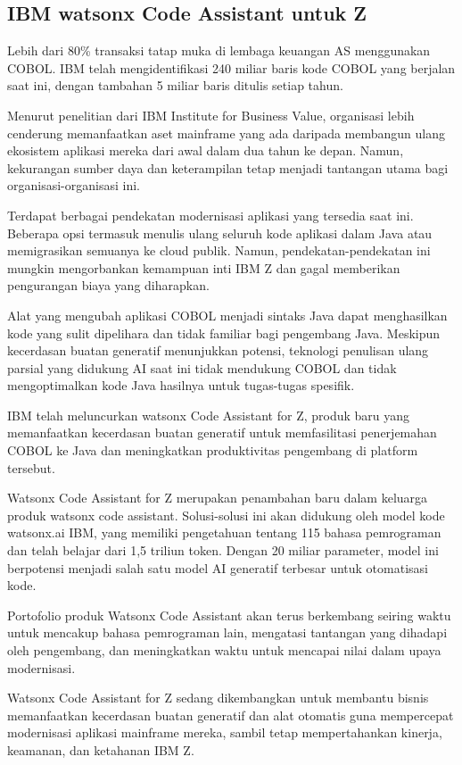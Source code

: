 \documentclass{article}
\begin{document}
\subsection{IBM watsonx Code Assistant untuk Z}
Lebih dari 80\% transaksi tatap muka di lembaga keuangan AS menggunakan COBOL. IBM telah mengidentifikasi 240 miliar baris kode COBOL yang berjalan saat ini, dengan tambahan 5 miliar baris ditulis setiap tahun.

Menurut penelitian dari IBM Institute for Business Value, organisasi lebih cenderung memanfaatkan aset mainframe yang ada daripada membangun ulang ekosistem aplikasi mereka dari awal dalam dua tahun ke depan. Namun, kekurangan sumber daya dan keterampilan tetap menjadi tantangan utama bagi organisasi-organisasi ini.

Terdapat berbagai pendekatan modernisasi aplikasi yang tersedia saat ini. Beberapa opsi termasuk menulis ulang seluruh kode aplikasi dalam Java atau memigrasikan semuanya ke cloud publik. Namun, pendekatan-pendekatan ini mungkin mengorbankan kemampuan inti IBM Z dan gagal memberikan pengurangan biaya yang diharapkan.

Alat yang mengubah aplikasi COBOL menjadi sintaks Java dapat menghasilkan kode yang sulit dipelihara dan tidak familiar bagi pengembang Java. Meskipun kecerdasan buatan generatif menunjukkan potensi, teknologi penulisan ulang parsial yang didukung AI saat ini tidak mendukung COBOL dan tidak mengoptimalkan kode Java hasilnya untuk tugas-tugas spesifik.

IBM telah meluncurkan watsonx Code Assistant for Z, produk baru yang memanfaatkan kecerdasan buatan generatif untuk memfasilitasi penerjemahan COBOL ke Java dan meningkatkan produktivitas pengembang di platform tersebut.

Watsonx Code Assistant for Z merupakan penambahan baru dalam keluarga produk watsonx code assistant. Solusi-solusi ini akan didukung oleh model kode watsonx.ai IBM, yang memiliki pengetahuan tentang 115 bahasa pemrograman dan telah belajar dari 1,5 triliun token. Dengan 20 miliar parameter, model ini berpotensi menjadi salah satu model AI generatif terbesar untuk otomatisasi kode.

Portofolio produk Watsonx Code Assistant akan terus berkembang seiring waktu untuk mencakup bahasa pemrograman lain, mengatasi tantangan yang dihadapi oleh pengembang, dan meningkatkan waktu untuk mencapai nilai dalam upaya modernisasi.

Watsonx Code Assistant for Z sedang dikembangkan untuk membantu bisnis memanfaatkan kecerdasan buatan generatif dan alat otomatis guna mempercepat modernisasi aplikasi mainframe mereka, sambil tetap mempertahankan kinerja, keamanan, dan ketahanan IBM Z.
\end{document}
